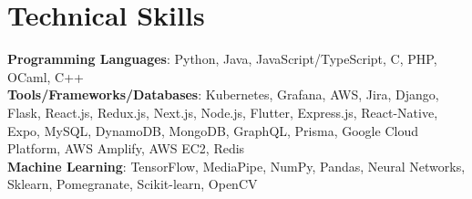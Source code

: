 \documentclass[letterpaper,10pt]{article}
\begin{document}
\section{Technical Skills}
 \begin{itemize}[leftmargin=0.15in, label={}]
    \small{\item{
     \textbf{Programming Languages}{: Python, Java, JavaScript/TypeScript, C, PHP, OCaml, C++} \\
     \vspace{2pt}
     \textbf{Tools/Frameworks/Databases}{: Kubernetes, Grafana, AWS, Jira, Django, Flask, React.js, Redux.js, Next.js, Node.js, Flutter, Express.js, React-Native, Expo, MySQL, DynamoDB, MongoDB, GraphQL, Prisma, Google Cloud Platform, AWS Amplify, AWS
EC2, Redis} \\
     \vspace{2pt}
     \textbf{Machine Learning}{: TensorFlow, MediaPipe, NumPy, Pandas, Neural Networks, Sklearn, Pomegranate, Scikit-learn, OpenCV} \\
    }}
 \end{itemize}


\end{document}
